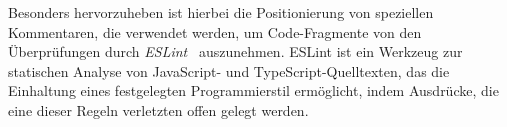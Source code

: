 Besonders hervorzuheben ist hierbei die Positionierung von speziellen Kommentaren, die verwendet werden, um Code-Fragmente von den Überprüfungen durch \textit{ESLint}~\autocite{ESLINT} auszunehmen. ESLint ist ein Werkzeug zur statischen Analyse von JavaScript- und TypeScript-Quelltexten, das die Einhaltung eines festgelegten Programmierstil ermöglicht, indem Ausdrücke, die eine dieser Regeln verletzten offen gelegt werden.

